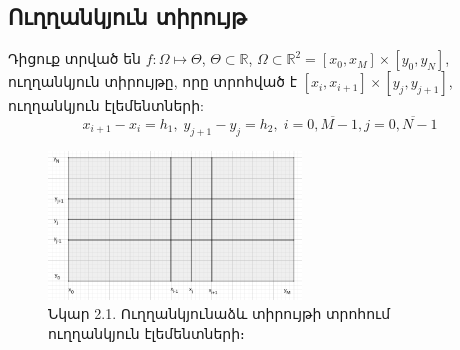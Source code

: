 \documentclass[fleqn, bachelor,subf,12pt,notitlepage]{article}
\begin{document}
\subsection*{Ուղղանկյուն տիրույթ}
Դիցուք տրված են $f:\Omega\mapsto \Theta$,  $\Theta \subset \mathbb{R}$, $\Omega \subset \mathbb{R}^{2} = \left[x_{0}, x_{M}\right] \times \left[y_{0}, y_{N}\right]$,  ուղղանկյուն տիրույթը, որը տրոհված է $\left[x_{i}, x_{i+1}\right] \times \left[y_{j}, y_{j+1}\right]$, ուղղանկյուն էլեմենտների:
$$x_{i+1}-x_{i}=h_{1}, \; y_{j+1}-y_{j}=h_{2}, \; i=\overline{0, M-1}, j=\overline{0, N-1}$$
\begin{figure}[h!]
\centering
\includegraphics[width=0.6\textwidth]{images/two_var_linear}
\captionsetup{labelformat=empty}
\caption{\hfill Նկար 2.1. Ուղղանկյունաձև տիրույթի տրոհում ուղղանկյուն էլեմենտների։}
\end{figure}
\end{document}
